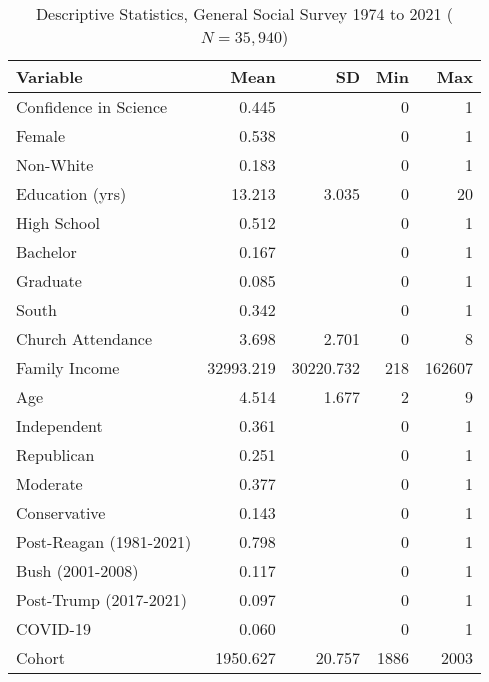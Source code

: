 \begin{table}[ht]
\centering
\caption{Descriptive Statistics, General Social Survey 1974 to 2021 ($N=35,940$)} 
\begin{tabularx}{\textwidth}{Xrrrr}
  \toprule
Variable & Mean & SD & Min & Max \\ 
  \midrule
Confidence in Science & 0.445 &  & 0 & 1 \\ 
  Female & 0.538 &  & 0 & 1 \\ 
  Non-White & 0.183 &  & 0 & 1 \\ 
  Education (yrs) & 13.213 & 3.035 & 0 & 20 \\ 
  High School & 0.512 &  & 0 & 1 \\ 
  Bachelor & 0.167 &  & 0 & 1 \\ 
  Graduate & 0.085 &  & 0 & 1 \\ 
  South & 0.342 &  & 0 & 1 \\ 
  Church Attendance & 3.698 & 2.701 & 0 & 8 \\ 
  Family Income & 32993.219 & 30220.732 & 218 & 162607 \\ 
  Age & 4.514 & 1.677 & 2 & 9 \\ 
  Independent & 0.361 &  & 0 & 1 \\ 
  Republican & 0.251 &  & 0 & 1 \\ 
  Moderate & 0.377 &  & 0 & 1 \\ 
  Conservative & 0.143 &  & 0 & 1 \\ 
  Post-Reagan (1981-2021) & 0.798 &  & 0 & 1 \\ 
  Bush (2001-2008) & 0.117 &  & 0 & 1 \\ 
  Post-Trump (2017-2021) & 0.097 &  & 0 & 1 \\ 
  COVID-19 & 0.060 &  & 0 & 1 \\ 
  Cohort & 1950.627 & 20.757 & 1886 & 2003 \\ 
   \bottomrule
\end{tabularx}
\end{table}
